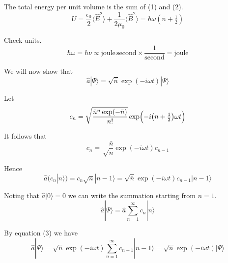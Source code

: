 \documentclass[12pt]{article}
\begin{document}
The total energy per unit volume is the sum of (1) and (2).
\begin{equation*}
U=\frac{\epsilon_0}{2}\langle\hat E^2\rangle
+\frac{1}{2\mu_0}\langle\hat B^2\rangle
=\hbar\omega\left(\bar n+\tfrac{1}{2}\right)
\end{equation*}

Check units.
\begin{equation*}
\hbar\omega=h\nu\propto\text{joule}\,\text{second}\times\frac{1}{\text{second}}=\text{joule}
\end{equation*}

\newpage

We will now show that
\begin{equation*}
\hat a|\Psi\rangle=\sqrt{\bar n}\exp(-i\omega t)|\Psi\rangle
\end{equation*}

Let
\begin{equation*}
c_n=\sqrt{\frac{\bar n^n\exp(-\bar n)}{n!}}
\exp\Bigl(-i\bigl(n+\tfrac{1}{2}\bigr)\omega t\Bigr)
\end{equation*}

It follows that
\begin{equation*}
c_n=\sqrt\frac{\bar n}{n}\exp(-i\omega t)c_{n-1}
\end{equation*}

Hence
\begin{equation*}
\hat a\big(c_n|n\rangle\big)=c_n\sqrt{n}|n-1\rangle=\sqrt{\bar n}\exp(-i\omega t)c_{n-1}|n-1\rangle
\tag{3}
\end{equation*}

Noting that $\hat a|0\rangle=0$ we can write the summation starting from $n=1$.
\begin{equation*}
\hat a|\Psi\rangle=\hat a\sum_{n=1}^\infty c_n|n\rangle
\end{equation*}

By equation (3) we have
\begin{equation*}
\hat a|\Psi\rangle=\sqrt{\bar n}\exp(-i\omega t)\sum_{n=1}^\infty c_{n-1}|n-1\rangle
=\sqrt{\bar n}\exp(-i\omega t)|\Psi\rangle
\end{equation*}
\end{document}
